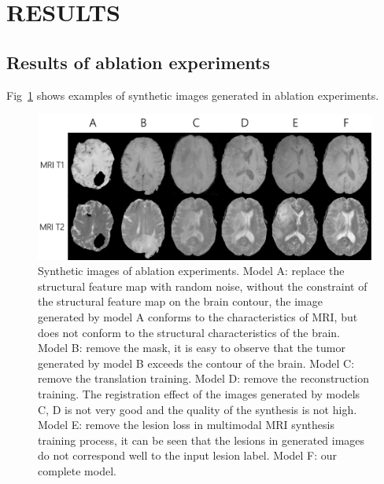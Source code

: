 \documentclass[runningheads]{llncs}
\begin{document}
\section{RESULTS}
\subsection{Results of ablation experiments}
Fig~\ref{ablation} shows examples of synthetic images generated in ablation experiments. 

\begin{figure}
	\centering
	\includegraphics[width=0.98\linewidth]{figures/ablation}
	\caption{Synthetic images of ablation experiments. Model A: replace the structural feature map with random noise, without the constraint of the structural feature map on the brain contour, the image generated by model A conforms to the characteristics of MRI, but does not conform to the structural characteristics of the brain. Model B: remove the mask, it is easy to observe that the tumor generated by model B exceeds the contour of the brain. Model C: remove the translation training. Model D: remove the reconstruction training. The registration effect of the images generated by models C, D is not very good and the quality of the synthesis is not high. Model E: remove the lesion loss in multimodal MRI synthesis training process, it can be seen that the lesions in generated images do not correspond well to the input lesion label. Model F: our complete model.}
	\label{ablation}
\end{figure}
\end{document}
